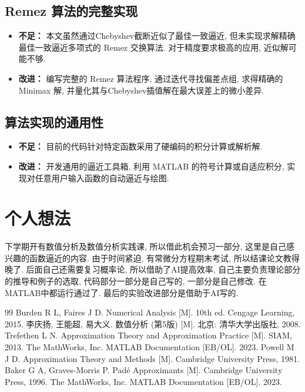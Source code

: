 \documentclass[UTF8, a4paper, 11pt]{ctexart}
\begin{document}
\subsection{Remez 算法的完整实现}
\begin{itemize}
    \item \textbf{不足：} 本文虽然通过Chebyshev截断近似了最佳一致逼近, 但未实现求解精确最佳一致逼近多项式的 Remez 交换算法. 对于精度要求极高的应用, 近似解可能不够. 
    \item \textbf{改进：} 编写完整的 Remez 算法程序, 通过迭代寻找偏差点组, 求得精确的 Minimax 解, 并量化其与Chebyshev插值解在最大误差上的微小差异. 
\end{itemize}

\subsection{算法实现的通用性}
\begin{itemize}
    \item \textbf{不足：} 目前的代码针对特定函数采用了硬编码的积分计算或解析解. 
    \item \textbf{改进：} 开发通用的逼近工具箱, 利用 MATLAB 的符号计算或自适应积分, 实现对任意用户输入函数的自动逼近与绘图. 
\end{itemize}

\section{个人想法}
    下学期开有数值分析及数值分析实践课, 所以借此机会预习一部分, 这里是自己感兴趣的函数逼近的内容. 由于时间紧迫, 有常微分方程期末考试, 所以结课论文教得晚了. 后面自己还需要复习概率论, 所以借助了AI提高效率, 自己主要负责理论部分的推导和例子的选取, 代码部分一部分是自己写的, 一部分是自己修改. 在MATLAB中都运行通过了. 最后的实验改进部分是借助于AI写的. 
\begin{thebibliography}{99}
 Burden R L, Faires J D. Numerical Analysis [M]. 10th ed. Cengage Learning, 2015.
 李庆扬, 王能超, 易大义. 数值分析 (第5版) [M]. 北京: 清华大学出版社, 2008.
 Trefethen L N. Approximation Theory and Approximation Practice [M]. SIAM, 2013.
 The MathWorks, Inc. MATLAB Documentation [EB/OL]. 2023.
 Powell M J D. Approximation Theory and Methods [M]. Cambridge University Press, 1981. 
 Baker G A, Graves-Morris P. Padé Approximants [M]. Cambridge University Press, 1996. 
 The MathWorks, Inc. MATLAB Documentation [EB/OL]. 2023.
\end{thebibliography}
\end{document}
